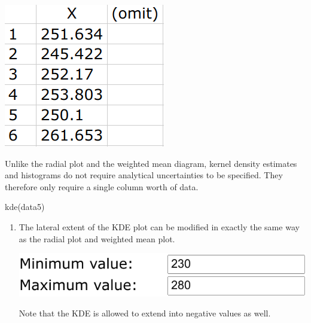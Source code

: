 \begin{refsection}
\noindent\begin{minipage}[t]{.2\linewidth}
  \strut\vspace*{-\baselineskip}\newline
  \includegraphics[width=\linewidth]{../figures/OtherKDEdata.png}
\end{minipage}
\begin{minipage}[t]{.8\linewidth}
  Unlike the radial plot and the weighted mean diagram, kernel density
  estimates and histograms do not require analytical uncertainties to
  be specified. They therefore only require a single column worth of
  data.
\end{minipage}

\begin{console}
kde(data5)
\end{console}

\begin{enumerate}

\item The lateral extent of the KDE plot can be modified in exactly
  the same way as the radial plot and weighted mean plot.

\noindent\begin{minipage}[t]{.4\linewidth}
\strut\vspace*{-\baselineskip}\newline
\includegraphics[width=\linewidth]{../figures/OtherKDEfromto.png}
\end{minipage}
\begin{minipage}[t]{.6\linewidth}
  Note that the KDE is allowed to extend into negative values as well.
\end{minipage}


\end{enumerate}
\end{refsection}
